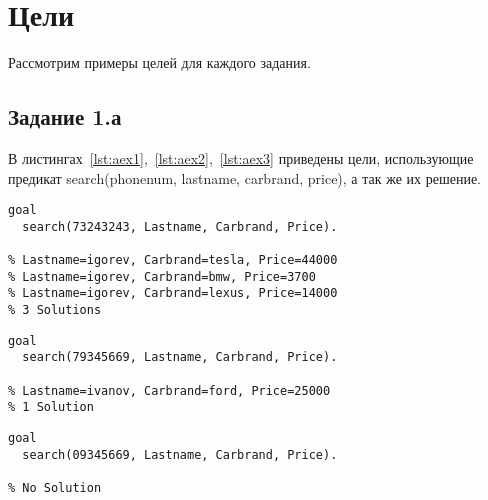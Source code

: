\section{Цели}
Рассмотрим примеры целей для каждого задания.

\subsection{Задание 1.а}
В листингах~\ref{lst:aex1},~\ref{lst:aex2},~\ref{lst:aex3} приведены цели, использующие предикат search(phonenum, lastname, carbrand, price), а так же их решение.

\begin{lstlisting}[caption={Пример \textnumero1},label={lst:aex1}]
goal
  search(73243243, Lastname, Carbrand, Price).

% Lastname=igorev, Carbrand=tesla, Price=44000
% Lastname=igorev, Carbrand=bmw, Price=3700
% Lastname=igorev, Carbrand=lexus, Price=14000
% 3 Solutions
\end{lstlisting}

\begin{lstlisting}[caption={Пример \textnumero2},label={lst:aex2}]
goal
  search(79345669, Lastname, Carbrand, Price).

% Lastname=ivanov, Carbrand=ford, Price=25000
% 1 Solution
\end{lstlisting}

\begin{lstlisting}[caption={Пример \textnumero3},label={lst:aex3}]
goal
  search(09345669, Lastname, Carbrand, Price).

% No Solution
\end{lstlisting}

